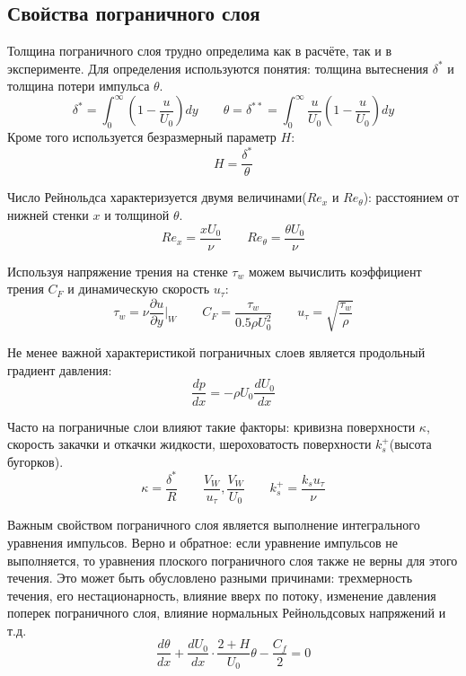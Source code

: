 \subsection{Свойства пограничного слоя}
	
	Толщина пограничного слоя трудно определима как в расчёте, так и в эксперименте. Для определения используются понятия: толщина вытеснения $\delta^*$ и толщина потери импульса $\theta$.
	\begin{equation}
		\delta^* = \int_{0}^{\infty}(1 - \frac{u}{U_0})dy \qquad \theta = \delta^{**} = \int_{0}^{\infty} \frac{u}{U_0}(1 - \frac{u}{U_0})dy
	\end{equation}
	Кроме того используется безразмерный параметр $H$:
	\begin{equation}
		H = \frac{\delta^*}{\theta}
	\end{equation}
	
	Число Рейнольдса характеризуется двумя величинами($Re_x$ и $Re_\theta$): расстоянием от нижней стенки $x$ и толщиной $\theta$.
	\begin{equation}
		Re_x = \frac{xU_0}{\nu} \qquad Re_\theta = \frac{\theta U_0}{\nu}
	\end{equation}
	
	Используя напряжение трения на стенке $\tau_w$ можем вычислить коэффициент трения $C_F$ и динамическую скорость $u_\tau$:
	\begin{equation}
		\tau_w = \nu\frac{\partial u}{\partial y}\bigg|_W \qquad C_F = \frac{\tau_w}{0.5\rho U_0^2} \qquad u_\tau = \sqrt{\frac{\tau_w}{\rho}}
	\end{equation}
	
	Не менее важной характеристикой пограничных слоев является продольный градиент давления:
	\begin{equation}
		\frac{dp}{dx} = -\rho U_0 \frac{dU_0}{dx}
	\end{equation}
	
	Часто на пограничные слои влияют такие факторы: кривизна поверхности $\kappa$, скорость закачки и откачки жидкости, шероховатость поверхности $k_s^+$(высота бугорков).
	\begin{equation}
		\kappa = \frac{\delta^*}{R} \qquad \frac{V_W}{u_\tau}, \frac{V_W}{U_0} \qquad k_s^+ = \frac{k_s u_\tau}{\nu}
	\end{equation}
	
	Важным свойством пограничного слоя является выполнение интегрального уравнения импульсов. Верно и обратное: если уравнение импульсов не выполняется, то уравнения плоского пограничного слоя также не верны для этого течения. Это может быть обусловлено разными причинами: трехмерность течения, его нестационарность, влияние вверх по потоку, изменение давления поперек пограничного слоя, влияние нормальных Рейнольдсовых напряжений и т.д.
	\begin{equation}
		\frac{d\theta}{dx} + \frac{dU_0}{dx}\cdot\frac{2 + H}{U_0}\theta - \frac{C_f}{2} = 0
	\end{equation}


